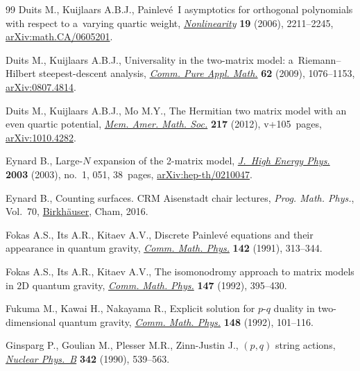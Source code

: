 \begin{thebibliography}{99}
Duits M., Kuijlaars A.B.J., Painlev\'e~{I} asymptotics for orthogonal
 polynomials with respect to a~varying quartic weight,
 \href{https://doi.org/10.1088/0951-7715/19/10/001}{\textit{Nonlinearity}}
 \textbf{19} (2006), 2211--2245,
 \href{http://arxiv.org/abs/math.CA/0605201}{arXiv:math.CA/0605201}.

Duits M., Kuijlaars A.B.J., Universality in the two-matrix model:
 a~{R}iemann--{H}ilbert steepest-descent analysis,
 \href{https://doi.org/10.1002/cpa.20269}{\textit{Comm. Pure Appl. Math.}}
 \textbf{62} (2009), 1076--1153,
 \href{http://arxiv.org/abs/0807.4814}{arXiv:0807.4814}.

Duits M., Kuijlaars A.B.J., Mo M.Y., The {H}ermitian two matrix model with an
 even quartic potential,
 \href{https://doi.org/10.1090/S0065-9266-2011-00639-8}{\textit{Mem. Amer.
 Math. Soc.}} \textbf{217} (2012), v+105~pages,
 \href{http://arxiv.org/abs/1010.4282}{arXiv:1010.4282}.

Eynard B., Large-{$N$} expansion of the 2-matrix model,
 \href{https://doi.org/10.1088/1126-6708/2003/01/051}{\textit{J.~High Energy
 Phys.}} \textbf{2003} (2003), no.~1, 051, 38~pages,
 \href{http://arxiv.org/abs/hep-th/0210047}{arXiv:hep-th/0210047}.

Eynard B., Counting surfaces. CRM Aisenstadt chair lectures, \textit{Prog.
 Math. Phys.}, Vol.~70,
 \href{https://doi.org/10.1007/978-3-7643-8797-6}{Birkh\"auser}, Cham, 2016.

Fokas A.S., Its A.R., Kitaev A.V., Discrete {P}ainlev\'e equations and their
 appearance in quantum gravity,
 \href{https://doi.org/10.1007/BF02102066}{\textit{Comm. Math. Phys.}}
 \textbf{142} (1991), 313--344.

Fokas A.S., Its A.R., Kitaev A.V., The isomonodromy approach to matrix models
 in {$2$}{D} quantum gravity,
 \href{https://doi.org/10.1007/BF02096594}{\textit{Comm. Math. Phys.}}
 \textbf{147} (1992), 395--430.

Fukuma M., Kawai H., Nakayama R., Explicit solution for {$p$}-{$q$} duality in
 two-dimensional quantum gravity,
 \href{https://doi.org/10.1007/BF02102366}{\textit{Comm. Math. Phys.}}
 \textbf{148} (1992), 101--116.

Ginsparg P., Goulian M., Plesser M.R., Zinn-Justin J., {$(p,q)$} string
 actions, \href{https://doi.org/10.1016/0550-3213(90)90326-9}{\textit{Nuclear
 Phys.~B}} \textbf{342} (1990), 539--563.


\end{thebibliography}

